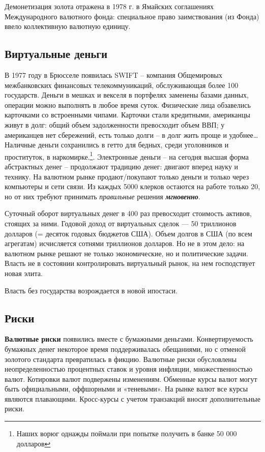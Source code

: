 Демонетизация золота отражена в 1978 г. в Ямайских соглашениях Международного валютного фонда: специальное право
заимствования (из Фонда) ввело \flqq коллективную валютную единицу\frqq.

\subsection[Виртуальные деньги]{Виртуальные деньги}

В 1977 году в Брюсселе появилась \foreignlanguage{english}{SWIFT} – компания Общемировых межбанковских финансовых
телекоммуникаций, обслуживающая более 100 государств. Деньги в мешках и векселя в портфелях заменены базами данных,
операции можно выполнять в любое время суток. Физические лица обзавелись карточками со встроенными чипами. Карточки
стали кредитными, американцы живут в долг: общий объем задолженности превосходит объем ВВП; у американцев нет
сбережений, есть только долги – в долг жить проще и удобнее… Наличные деньги сохранились в гетто для бедных, среди
уголовников и проституток, в наркомирке.\footnote{Наших ворюг однажды поймали при попытке получить в
банке 50 000 долларов }\textit{}. Электронные деньги – на сегодня высшая форма абстрактных
денег – продолжают традицию денег: двигают вперед науку и технику. На валютном рынке продают/покупают только деньги и
только через компьютеры и сети связи. Из каждых 5000 клерков остаются на работе только 20, но от них требуют принимать
\textit{правильные} решения \textbf{\textit{мгновенно}}.


Суточный оборот виртуальных денег в 400 раз превосходит стоимость активов, стоящих за ними. Годовой доход от виртуальных
сделок — 50 триллионов долларов (= десяток годовых бюджетов США). Объем долгов в США (по всем агрегатам) исчисляется
сотнями триллионов долларов. Но не в этом дело: на валютном рынке решают не только экономические, но и политические
задачи. Власть не в состоянии контролировать виртуальный рынок, на нем господствует новая элита.


Власть без государства возрождается в новой ипостаси.

\subsection[Риски ]{Риски }

\textbf{Валютные риски} появились вместе с бумажными деньгами. Конвертируемость бумажных денег некоторое время
поддерживалась обещаниями, но с отменой золотого стандарта превратилась в фикцию. Валютные риски обусловлены
неопределенностью процентных ставок и уровня инфляции, множественностью валют. Котировки валют подвержены изменениям.
Обменные курсы валют могут быть официальными, оффшорными и «теневыми». На рынке валют все курсы являются плавающими.
Кросс-курсы с учетом транзакций вносят дополнительные риски.


